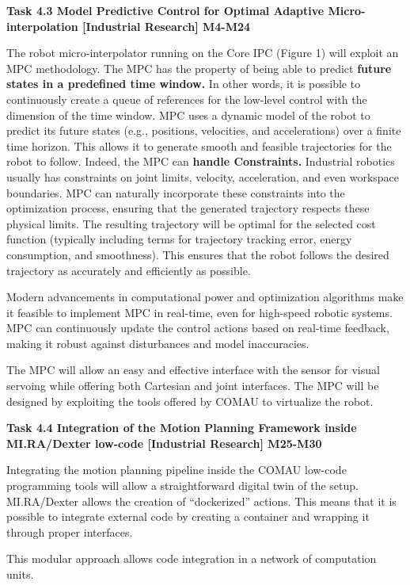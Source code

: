 \begin{planactivitybody}
\plantaskskip
\textbf{Task 4.3 Model Predictive Control for Optimal Adaptive
Micro-interpolation {[}Industrial Research{]} M4-M24}

The robot micro-interpolator running on the Core IPC (Figure 1) will
exploit an MPC methodology. The MPC has the property of being able to
predict \textbf{future states in a predefined time window.} In other
words, it is possible to continuously create a queue of references for
the low-level control with the dimension of the time window. MPC uses a
dynamic model of the robot to predict its future states (e.g.,
positions, velocities, and accelerations) over a finite time horizon.
This allows it to generate smooth and feasible trajectories for the
robot to follow. Indeed, the MPC can \textbf{handle Constraints.}
Industrial robotics usually has constraints on joint limits, velocity,
acceleration, and even workspace boundaries. MPC can naturally
incorporate these constraints into the optimization process, ensuring
that the generated trajectory respects these physical limits. The
resulting trajectory will be optimal for the selected cost function
(typically including terms for trajectory tracking error, energy
consumption, and smoothness). This ensures that the robot follows the
desired trajectory as accurately and efficiently as possible.

Modern advancements in computational power and optimization algorithms
make it feasible to implement MPC in real-time, even for high-speed
robotic systems. MPC can continuously update the control actions based
on real-time feedback, making it robust against disturbances and model
inaccuracies.

The MPC will allow an easy and effective interface with the sensor for
visual servoing while offering both Cartesian and joint interfaces. The
MPC will be designed by exploiting the tools offered by COMAU to
virtualize the robot.

\plantaskskip
\textbf{Task 4.4 Integration of the Motion Planning Framework inside
MI.RA/Dexter low-code {[}Industrial Research{]} M25-M30}

Integrating the motion planning pipeline inside the COMAU low-code
programming tools will allow a straightforward digital twin of the
setup. MI.RA/Dexter allows the creation of ``dockerized'' actions. This
means that it is possible to integrate external code by creating a
container and wrapping it through proper interfaces.

This modular approach allows code integration in a network of
computation units.


\end{planactivitybody}
